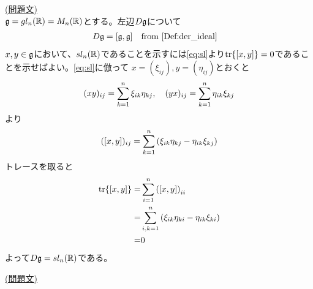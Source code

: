 \documentclass[../main]{subfiles}
\begin{document}

\setcounter{section}{1}
\setcounter{section}{2}
\begin{solution}\label{sol:1}
  \href{prob:1}{(問題文)}\\
  $\mathfrak{g}=gl_n(\mathbb{R})=M_n(\mathbb{R})$とする。左辺$D\mathfrak{g}$について
  \begin{align*}
    D\g=\comm{\g}{\g} \qq{from \cref{Def:der_ideal}}
  \end{align*}
  $x,y\in\mathfrak{g}$において、$sl_n(\mathbb{R})$であることを示すには\eqref{eq:sl}より$\tr{\comm{x}{y}}=0$であることを示せばよい。\eqref{eq:sl}に倣って
  $x=(\xi_{ij}),y=(\eta_{ij})$とおくと
  \begin{align*}
    (xy)_{ij}=\sum_{k=1}^{n}\xi_{ik}\eta_{kj}\qc
    (yx)_{ij}=\sum_{k=1}^{n}\eta_{ik}\xi_{kj}
  \end{align*}
  より
  \begin{align*}
    (\comm{x}{y})_{ij}=\sum_{k=1}^{n}\qty(\xi_{ik}\eta_{kj}-\eta_{ik}\xi_{kj})
  \end{align*}
  トレースを取ると
  \begin{align*}
    \tr{\comm{x}{y}}=&\sum_{i=1}^{n}\qty(\comm{x}{y})_{ii}\\
    =&\sum_{i,k=1}^{n}\qty(\xi_{ik}\eta_{ki}-\eta_{ik}\xi_{ki})\\
    =&0
  \end{align*}
  よって$D\mathfrak{g}=sl_n(\mathbb{R})$である。
\end{solution}

\begin{solution}\label{sol:2}
  \href{prob:2}{(問題文)}
\end{solution}
\end{document}
